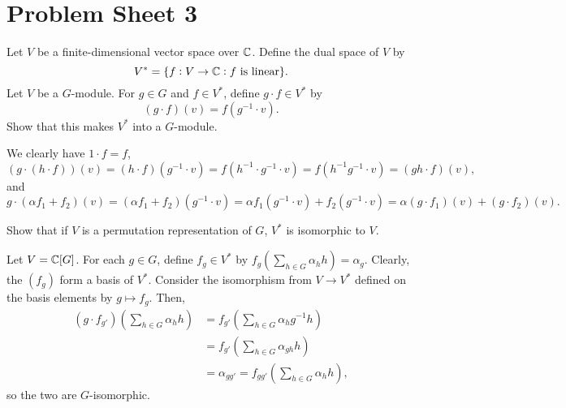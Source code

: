 \documentclass{article}
\begin{document}
\section{Problem Sheet 3}

	\begin{problem}
		\label{prob:group-action-dual}
		Let $V$ be a finite-dimensional vector space over $\mathbb{C}$. Define the dual space of $V$ by
		\[ V^* = \{ f : V \to \mathbb{C} : f \text{ is linear} \}. \]
		Let $V$ be a $G$-module. For $g \in G$ and $f \in V^*$, define $g \cdot f \in V^*$ by
		\[ (g \cdot f)(v) = f(g^{-1} \cdot v). \]
		Show that this makes $V^*$ into a $G$-module.
	\end{problem}
	\begin{solution*}
		We clearly have $1 \cdot f = f$,
		\[ (g \cdot (h \cdot f)) (v) = (h \cdot f)(g^{-1} \cdot v) = f(h^{-1} \cdot g^{-1} \cdot v) = f(h^{-1}g^{-1} \cdot v) = (gh \cdot f)(v),  \]
		and
		\[ g \cdot (\alpha f_1 + f_2) (v) = (\alpha f_1 + f_2) (g^{-1} \cdot v) = \alpha f_1(g^{-1} \cdot v) + f_2(g^{-1} \cdot v) = \alpha (g \cdot f_1)(v) + (g \cdot f_2) (v). \]
	\end{solution*}

	\begin{problem}
		Show that if $V$ is a permutation representation of $G$, $V^*$ is isomorphic to $V$.
	\end{problem}
	\begin{solution*}
		Let $V = \mathbb{C}[G]$. For each $g \in G$, define $f_g \in V^*$ by $f_g(\sum_{h \in G} \alpha_h h) = \alpha_g$. Clearly, the $(f_g)$ form a basis of $V^*$. Consider the isomorphism from $V \to V^*$ defined on the basis elements by $g \mapsto f_g$. Then,
		\begin{align*}
			(g \cdot f_{g'})(\sum_{h \in G} \alpha_h h) &= f_{g'} (\sum_{h \in G} \alpha_{h} g^{-1} h) \\
				&= f_{g'} (\sum_{h \in G} \alpha_{gh} h) \\
				&= \alpha_{gg'} = f_{gg'}(\sum_{h \in G} \alpha_h h),
		\end{align*}
		so the two are $G$-isomorphic.
	\end{solution*}
\end{document}
